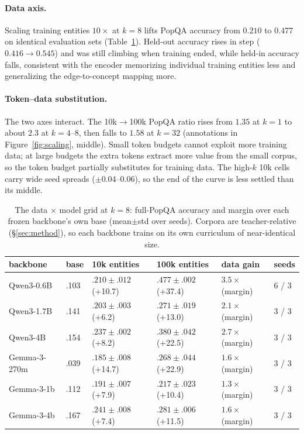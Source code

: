 \documentclass{article}
\newcommand{\popqa}{PopQA}
\begin{document}
\paragraph{Data axis.} Scaling training entities $10\times$ at $k{=}8$ lifts \popqa{}
accuracy from $0.210$ to $0.477$ on identical evaluation sets (Table~\ref{tab:grid}). Held-out
accuracy rises in step ($0.416 \to 0.545$) and was still climbing when training ended, while
held-in accuracy falls, consistent with the encoder memorizing individual training entities
less and generalizing the edge-to-concept mapping more.

\paragraph{Token--data substitution.} The two axes interact. The 10k$\to$100k \popqa{} ratio
rises from $1.35$ at $k{=}1$ to about $2.3$ at $k{=}4$--$8$, then falls to $1.58$ at $k{=}32$
(annotations in Figure~\ref{fig:scaling}, middle). Small token budgets cannot exploit more training
data; at large budgets the extra tokens extract more value from the small corpus, so the token
budget partially substitutes for training data. The high-$k$ 10k cells carry wide seed spreads
($\pm$0.04--0.06), so the end of the curve is less settled than its middle.


\begin{table}[t]
  \caption{The data $\times$ model grid at $k{=}8$: full-\popqa{} accuracy and margin over each
  frozen backbone's own base (mean$\pm$std over seeds). Corpora are teacher-relative
  (\S\ref{sec:method}), so each backbone trains on its own curriculum of near-identical size.}
  \label{tab:grid}
  \centering
  \small
  \begin{tabular}{llllll}
    \toprule
    backbone & base & 10k entities & 100k entities & data gain & seeds\\
    \midrule
    Qwen3-0.6B & .103 & $.210{\pm}.012$ (+10.7) & $.477{\pm}.002$ (+37.4) & $3.5\times$ (margin) & 6 / 3\\
    Qwen3-1.7B & .141 & $.203{\pm}.003$ (+6.2) & $.271{\pm}.019$ (+13.0) & $2.1\times$ (margin) & 3 / 3\\
    Qwen3-4B & .154 & $.237{\pm}.002$ (+8.2) & $.380{\pm}.042$ (+22.5) & $2.7\times$ (margin) & 3 / 3\\
    \midrule
    Gemma-3-270m & .039 & $.185{\pm}.008$ (+14.7) & $.268{\pm}.044$ (+22.9) & $1.6\times$ (margin) & 3 / 3\\
    Gemma-3-1b & .112 & $.191{\pm}.007$ (+7.9) & $.217{\pm}.023$ (+10.4) & $1.3\times$ (margin) & 3 / 3\\
    Gemma-3-4b & .167 & $.241{\pm}.008$ (+7.4) & $.281{\pm}.006$ (+11.5) & $1.6\times$ (margin) & 3 / 3\\
    \bottomrule
  \end{tabular}
\end{table}
\end{document}

